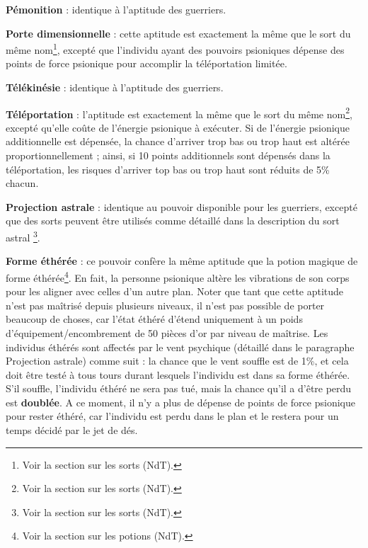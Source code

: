 \documentclass[11pt]{article}
\begin{document}
{\bigskip

\textbf{Pémonition} : identique à l'aptitude des guerriers.

\bigskip

\textbf{Porte dimensionnelle} : cette aptitude est exactement la même que le sort du même nom\footnote{Voir la section sur les sorts (NdT).}, excepté que l'individu ayant des pouvoirs psioniques dépense des points de force psionique pour accomplir la téléportation limitée.

\bigskip

\textbf{Télékinésie} : identique à l'aptitude des guerriers.

\bigskip

\textbf{Téléportation} : l'aptitude est exactement la même que le sort du même nom\footnote{Voir la section sur les sorts (NdT).}, excepté qu'elle coûte de l'énergie psionique à exécuter. Si de l'énergie psionique additionnelle est dépensée, la chance d'arriver trop bas ou trop haut est altérée proportionnellement ; ainsi, si 10 points additionnels sont dépensés dans la téléportation, les risques d'arriver top bas ou trop haut sont réduits de 5\% chacun.

\bigskip

\textbf{Projection astrale} : identique au pouvoir disponible pour les guerriers, excepté que des sorts peuvent être utilisés comme détaillé dans la description du \og sort astral \fg{}\footnote{Voir la section sur les sorts (NdT).}.

\bigskip

\textbf{Forme éthérée} : ce pouvoir confère la même aptitude que la potion magique de forme éthérée\footnote{Voir la section sur les potions (NdT).}. En fait, la personne psionique altère les vibrations de son corps pour les aligner avec celles d'un autre plan. Noter que tant que cette aptitude n'est pas maîtrisé depuis plusieurs niveaux, il n'est pas possible de porter beaucoup de choses, car l'état éthéré d'étend uniquement à un poids d'équipement/encombrement de 50 pièces d'or par niveau de maîtrise. Les individus éthérés sont affectés par le vent psychique (détaillé dans le paragraphe Projection astrale) comme suit : la chance que le vent souffle est de 1\%, et cela doit être testé à tous tours durant lesquels l'individu est dans sa forme éthérée. S'il souffle, l'individu éthéré ne sera pas tué, mais la chance qu'il a d'être perdu est \textbf{doublée}. A ce moment, il n'y a plus de dépense de points de force psionique pour rester éthéré, car l'individu est perdu dans le plan et le restera pour un temps décidé par le jet de dés.

}
\end{document}
